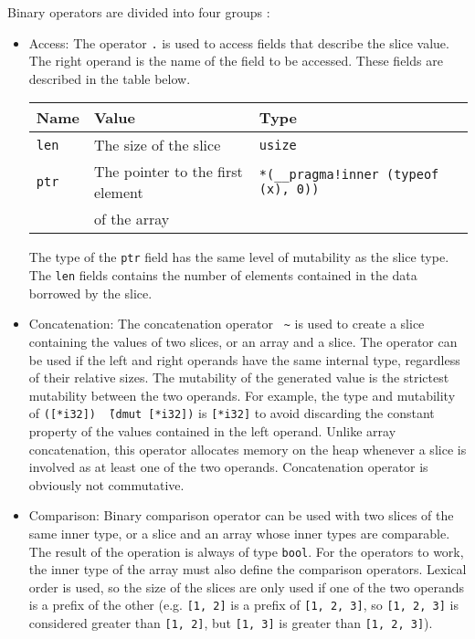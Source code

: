 Binary operators are divided into four groups :
\begin{itemize}
\item Access: The operator \texttt{.} is used to access fields that describe the slice value. The right operand is the name of the field to be accessed. These fields are described in the table below.

  \begin{center}\begin{adjustbox}{max width=\linewidth}
      \begin{tabular}{|l|ll|}
        \hline
        Name & Value & Type\\
        \hline
        \hline
        \texttt{len} & The size of the slice & \texttt{usize} \\
        \texttt{ptr} & The pointer to the first element  & \texttt{*(\_\_pragma!inner (typeof (x), 0))} \\
        & of the array & \\
        \hline
      \end{tabular}
  \end{adjustbox}\end{center}

  The type of the \texttt{ptr} field has the same level of mutability as the
  slice type. The \texttt{len} fields contains the number of elements contained
  in the data borrowed by the slice.

\item Concatenation: The concatenation operator ~\texttt{\~} is used to create a
  slice containing the values of two slices, or an array and a slice. The
  operator can be used if the left and right operands have the same internal
  type, regardless of their relative sizes. The mutability of the generated
  value is the strictest mutability between the two operands. For example, the
  type and mutability of \texttt{([*i32]) \~\ (dmut [*i32])} is \texttt{[*i32]}
  to avoid discarding the constant property of the values contained in the left
  operand. Unlike array concatenation, this operator allocates memory on the
  heap whenever a slice is involved as at least one of the two operands.
  Concatenation operator is obviously not commutative.

\item Comparison: Binary comparison operator can be used with two slices of the
  same inner type, or a slice and an array whose inner types are comparable. The
  result of the operation is always of type \texttt{bool}. For the operators to
  work, the inner type of the array must also define the comparison operators.
  Lexical order is used, so the size of the slices are only used if one of the
  two operands is a prefix of the other (e.g. \texttt{[1, 2]} is a prefix of
  \texttt{[1, 2, 3]}, so \texttt{[1, 2, 3]} is considered greater than
  \texttt{[1, 2]}, but \texttt{[1, 3]} is greater than \texttt{[1, 2, 3]}).


\end{itemize}
